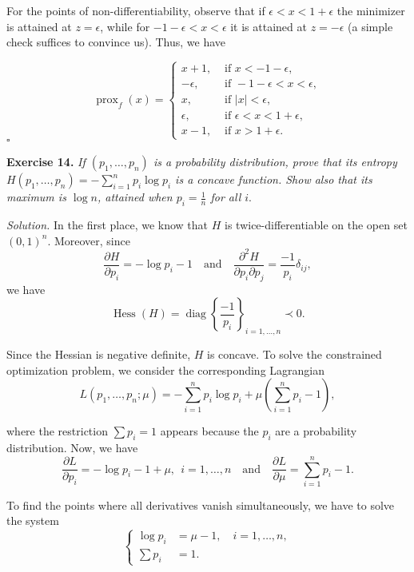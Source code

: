 \documentclass[12pt]{article}
\newcommand*{\QED}{\null\nobreak\hfill\ensuremath{\square}}%
\begin{document}
\begin{itemize}
For the points of non-differentiability, observe that if $\epsilon<x<1+\epsilon$ the minimizer is attained at $z=\epsilon$, while for $-1-\epsilon<x<\epsilon$ it is attained at $z=-\epsilon$ (a simple check suffices to convince us). Thus, we have

        \[
             \operatorname{prox}_f(x)= \begin{cases}
               x+1, & \text{ if } x< - 1 - \epsilon,\\
               -\epsilon,  & \text{ if } -1-\epsilon<x<\epsilon,\\
               x, & \text{ if } |x| < \epsilon,\\
               \epsilon,  & \text{ if } \epsilon < x < 1+\epsilon,\\
               x-1, & \text{ if } x>1+\epsilon.
           \end{cases}
        \]
        \QED
\end{itemize}

\textbf{Exercise 14. }\emph{If \( (p_1,\dots,p_n) \) is a probability distribution, prove that its entropy \( H(p_1, \dots, p_n) = - \sum_{i=1}^n p_i \log p_i\) is a concave function. Show also that its maximum is \( \log n \), attained when \( p_i = \frac{1}{n}\) for all $i$}.

\emph{Solution. } In the first place, we know that $H$ is twice-differentiable on the open set $(0,1)^n$. Moreover, since
\[
\frac{\partial H}{\partial p_i} = -\log p_i - 1 \quad \text{and} \quad \frac{\partial^2 H}{\partial p_i\partial p_j} = \frac{-1}{p_i}\delta_{ij},
\]
we have
\[
\operatorname{Hess}(H) = \operatorname{diag}\left\{\frac{-1}{p_i}\right\}_{i=1,\dots,n} \prec 0.
\]

Since the Hessian is negative definite, $H$ is concave. To solve the constrained optimization problem, we consider the corresponding Lagrangian
\[ L(p_1,\dots, p_n; \mu) = - \sum_{i=1}^n p_i \log p_i + \mu\left(\sum_{i=1}^n p_i - 1\right),\]

where the restriction $\sum p_i=1$ appears because the $p_i$ are a probability distribution. Now, we have
\[
     \frac{\partial L}{\partial p_i} = -\log p_i - 1 + \mu, \ \  i=1,\dots,n \quad \text{and} \quad \frac{\partial L}{\partial \mu} =\sum_{i=1}^n p_i - 1.
\]

To find the points where all derivatives vanish simultaneously, we have to solve the system
\[\begin{cases}
    \log p_i &= \mu - 1, \quad i=1,\dots,n,\\
    \sum p_i &= 1.
\end{cases}\]
\end{document}

